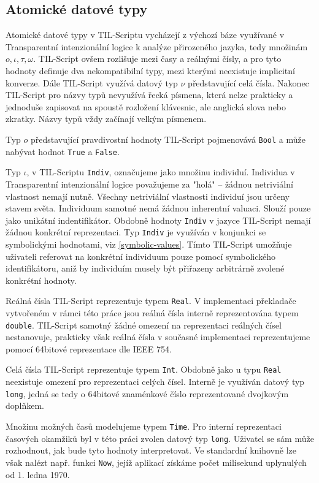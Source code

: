 \subsection{Atomické datové typy}

Atomické datové typy v TIL-Scriptu vycházejí z výchozí báze využívané v Transparentní intenzionální
logice k analýze přirozeného jazyka, tedy množinám ${o, \iota, \tau, \omega}$. TIL-Script ovšem
rozlišuje mezi časy a reálnými čísly, a pro tyto hodnoty definuje dva nekompatibilní typy, mezi
kterými neexistuje implicitní konverze. Dále TIL-Script využívá datový typ $\nu$ představující celá
čísla. Nakonec TIL-Script pro názvy typů nevyužívá řecká písmena, která nelze prakticky a jednoduše
zapisovat na spoustě rozložení klávesnic, ale anglická slova nebo zkratky. Názvy typů vždy začínají
velkým písmenem.

Typ $o$ představující pravdivostní hodnoty TIL-Script pojmenovává \lstinline{Bool} a může nabývat
hodnot \lstinline{True} a \lstinline{False}.

Typ $\iota$, v TIL-Scriptu \lstinline{Indiv}, označujeme jako množinu individuí. Individua
v Transparentní intenzionální logice považujeme za "holá" -- žádnou netriviální vlastnost nemají
nutně. Všechny netriviální vlastnosti individuí jsou určeny stavem světa. Individuum samotné nemá
žádnou inherentní valuaci. Slouží pouze jako unikátní indentifikátor. Obdobně hodnoty
\lstinline{Indiv} v jazyce TIL-Script nemají žádnou konkrétní reprezentaci. Typ \lstinline{Indiv}
je využíván v konjunkci se symbolickými hodnotami, viz \ref{symbolic-values}. Tímto TIL-Script
umožňuje uživateli referovat na konkrétní individuum pouze pomocí symbolického identifikátoru,
aniž by individuím musely být přiřazeny arbitrárně zvolené konkrétní hodnoty.

Reálná čísla TIL-Script reprezentuje typem \lstinline{Real}. V implementaci překladače vytvořeném
v rámci této práce jsou reálná čísla interně reprezentována typem \lstinline{double}. TIL-Script
samotný žádné omezení na reprezentaci reálných čísel nestanovuje, prakticky však reálná čísla
v současné implementaci reprezentujeme pomocí 64bitové reprezentace dle IEEE 754.

Celá čísla TIL-Script reprezentuje typem \lstinline{Int}. Obdobně jako u typu \lstinline{Real}
neexistuje omezení pro reprezentaci celých čísel. Interně je využíván datový typ \lstinline{long},
jedná se tedy o 64bitové znaménkové číslo reprezentované dvojkovým doplňkem.

Množinu možných časů modelujeme typem \lstinline{Time}. Pro interní reprezentaci časových okamžiků
byl v této práci zvolen datový typ \lstinline{long}. Uživatel se sám může rozhodnout, jak bude tyto
hodnoty interpretovat. Ve standardní knihovně lze však nalézt např. funkci \lstinline{Now}, jejíž
aplikací získáme počet milisekund uplynulých od 1. ledna 1970.

